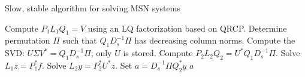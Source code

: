 \begin{algorithm}[t]
\caption{Slow, stable algorithm for solving MSN systems}
\label{alg:slow_msn_lq}
\begin{algorithmic}[1]
    \State Compute $P_{1}L_{1}Q_{1}=V$ using an LQ factorization
        based on QRCP.
    \State Determine permutation $\Pi$ such that $Q_{1}D_{s}^{-1}\Pi$
        has decreasing column norms.
    \State Compute the SVD:
        $U\Sigma V^{*} = Q_{1}D_{s}^{-1}\Pi$; only $U$ is stored.
    \State Compute $P_{2}L_{2}Q_{2} = U^{*}Q_{1}D_{s}^{-1}\Pi$.
    \State Solve $L_{1}z = P_{1}^{*}f$.
    \State Solve $L_{2}y = P_{2}^{*}U^{*}z$.
    \State Set $a = D_{s}^{-1}\Pi Q_{2}^{*}y$
    \State \Return $a$
\EndFunction
\end{algorithmic}
\end{algorithm}
